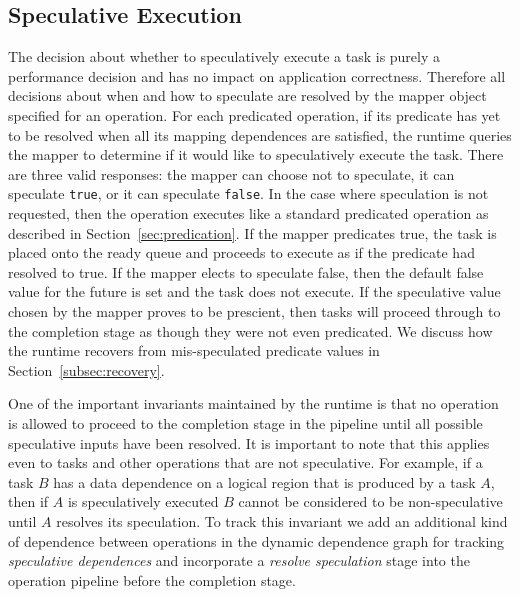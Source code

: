\subsection{Speculative Execution}
\label{subsec:specexec}
The decision about whether to speculatively execute a 
task is purely a performance decision and has no impact
on application correctness. Therefore all decisions about
when and how to speculate are resolved by the mapper
object specified for an operation. For each predicated
operation, if its predicate has yet to be resolved
when all its mapping dependences are satisfied, the
runtime queries the mapper to determine if it would
like to speculatively execute the task. There are three
valid responses: the mapper can choose not to speculate,
it can speculate {\tt true}, or it can speculate 
{\tt false}. In the case where speculation is not 
requested, then the operation executes like a standard
predicated operation as described in 
Section~\ref{sec:predication}. If the mapper predicates
true, the task is placed onto the ready queue and 
proceeds to execute as if the predicate had resolved 
to true. If the mapper elects to speculate false, then
the default false value for the future is set and the
task does not execute. If the speculative value chosen
by the mapper proves to be prescient, then tasks will
proceed through to the completion stage as though they
were not even predicated. We discuss how the runtime
recovers from mis-speculated predicate values in 
Section~\ref{subsec:recovery}.

One of the important invariants maintained by the runtime
is that no operation is allowed to proceed to the 
completion stage in the pipeline until all possible
speculative inputs have been resolved. It is important
to note that this applies even to tasks and other operations
that are not speculative. For example, if a task $B$ has
a data dependence on a logical region that is produced
by a task $A$, then if $A$ is speculatively executed $B$
cannot be considered to be non-speculative until $A$
resolves its speculation. To track this invariant we add
an additional kind of dependence between operations in 
the dynamic dependence graph for tracking {\em speculative
dependences} and incorporate a {\em resolve speculation}
stage into the operation pipeline before the 
completion stage.

